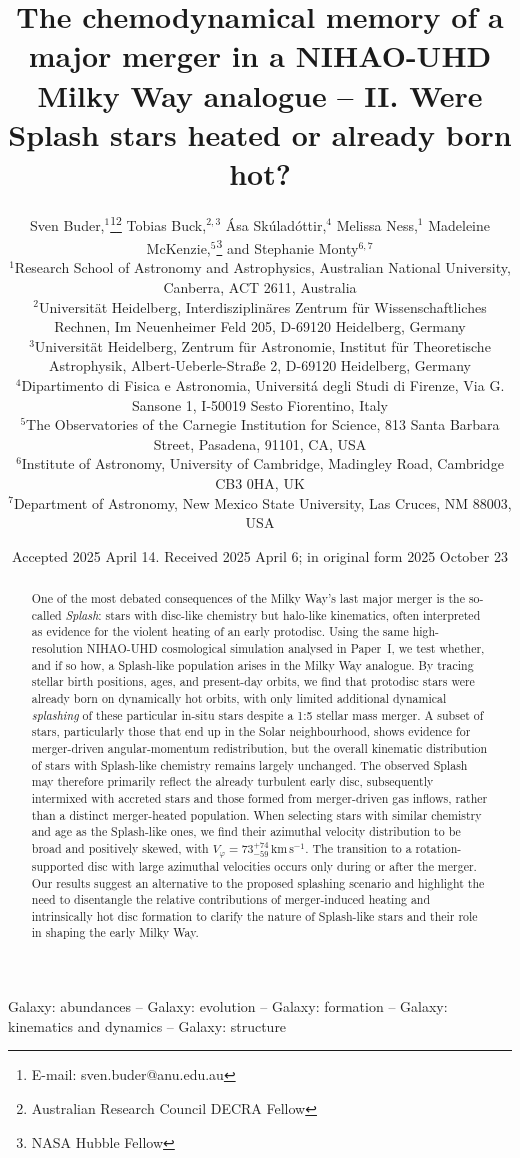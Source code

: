 \documentclass[fleqn,usenatbib]{mnras}
\title[Were Splash stars heated or already born hot?]{The chemodynamical memory of a major merger in a NIHAO-UHD Milky Way analogue -- II. Were Splash stars heated or already born hot?}
\author[S. Buder et al.]{Sven Buder,$^{1}$\thanks{E-mail: sven.buder@anu.edu.au}\thanks{Australian Research Council DECRA Fellow}\orcidlink{0000-0002-4031-8553}
Tobias Buck,$^{2,3}$\orcidlink{0000-0003-2027-399X}
Ása Skúladóttir,$^{4}$\orcidlink{0000-0001-9155-9018}
Melissa Ness,$^{1}$\orcidlink{0000-0001-5082-6693}
Madeleine McKenzie,$^{5}$\thanks{NASA Hubble Fellow}\orcidlink{0000-0002-1715-1257}
and\newauthor
Stephanie Monty$^{6, 7}$\orcidlink{0000-0002-9225-5822}
\\
$^{1}$Research School of Astronomy and Astrophysics, Australian National University, Canberra, ACT 2611, Australia\\
$^{2}$Universit{\"a}t Heidelberg, Interdisziplin{\"a}res Zentrum f{\"u}r Wissenschaftliches Rechnen, Im Neuenheimer Feld 205, D-69120 Heidelberg, Germany\\
$^{3}$Universit{\"a}t Heidelberg, Zentrum f{\"u}r Astronomie, Institut f{\"u}r Theoretische Astrophysik, Albert-Ueberle-Straße 2, D-69120 Heidelberg, Germany\\
$^{4}$Dipartimento di Fisica e Astronomia, Universitá degli Studi di Firenze, Via G. Sansone 1, I-50019 Sesto Fiorentino, Italy\\
$^{5}$The Observatories of the Carnegie Institution for Science, 813 Santa Barbara Street, Pasadena, 91101, CA, USA\\
$^{6}$Institute of Astronomy, University of Cambridge, Madingley Road, Cambridge CB3 0HA, UK\\
$^{7}$Department of Astronomy, New Mexico State University, Las Cruces, NM 88003, USA
}
\date{Accepted 2025 April 14. Received 2025 April 6; in original form 2025 October 23}
\begin{document}
\label{firstpage}
\pagerange{\pageref{firstpage}--\pageref{lastpage}}
\maketitle

\begin{abstract} %
One of the most debated consequences of the Milky Way's last major merger is the so-called \textit{Splash}: stars with disc-like chemistry but halo-like kinematics, often interpreted as evidence for the violent heating of an early protodisc. Using the same high-resolution NIHAO-UHD cosmological simulation analysed in Paper~I, we test whether, and if so how, a Splash-like population arises in the Milky Way analogue. By tracing stellar birth positions, ages, and present-day orbits, we find that protodisc stars were already born on dynamically hot orbits, with only limited additional dynamical \textit{splashing} of these particular in-situ stars despite a 1:5 stellar mass merger. A subset of stars, particularly those that end up in the Solar neighbourhood, shows evidence for merger-driven angular-momentum redistribution, but the overall kinematic distribution of stars with Splash-like chemistry remains largely unchanged. The observed Splash may therefore primarily reflect the already turbulent early disc, subsequently intermixed with accreted stars and those formed from merger-driven gas inflows, rather than a distinct merger-heated population. When selecting stars with similar chemistry and age as the Splash-like ones, we find their azimuthal velocity distribution to be broad and positively skewed, with $V_\varphi = 73_{-59}^{+74}\,\mathrm{km\,s^{-1}}$. The transition to a rotation-supported disc with large azimuthal velocities occurs only during or after the merger. Our results suggest an alternative to the proposed splashing scenario and highlight the need to disentangle the relative contributions of merger-induced heating and intrinsically hot disc formation to clarify the nature of Splash-like stars and their role in shaping the early Milky Way.
\end{abstract}

\begin{keywords}
Galaxy: abundances -- Galaxy: evolution -- Galaxy: formation -- Galaxy: kinematics and dynamics -- Galaxy: structure
\end{keywords}

\end{document}
